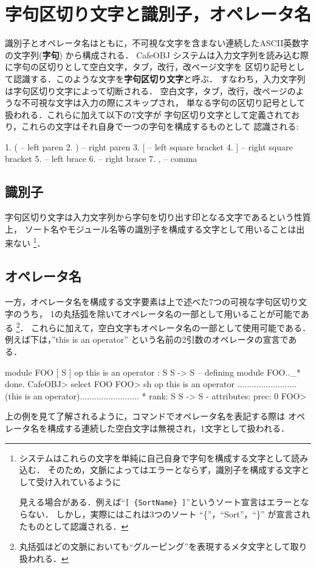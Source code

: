 \documentclass[a4paper,oneside,10pt]{memoir}
\newenvironment{vvtm}%
{\parskip=0pt\lineskip=0pt\begin{center}\begin{minipage}{0.8\textwidth}\begin{snugshade}}%
  {\end{snugshade}\end{minipage}\end{center}}
\begin{document}
\section{字句区切り文字と識別子，オペレータ名}
\label{sec:token}
識別子とオペレータ名はともに，不可視な文字を含まない連続したASCII英数字の文字列(\textbf{字句})
から構成される．
CafeOBJ システムは入力文字列を読み込む際に字句の区切りとして空白文字，タブ，改行，改ページ文字を
区切り記号として認識する．このような文字を\textbf{字句区切り文字}と呼ぶ．
すなわち，入力文字列は字句区切り文字によって切断される．
空白文字，タブ，改行，改ページのような不可視な文字は入力の際にスキップされ，
単なる字句の区切り記号として扱われる．これらに加えて以下の7文字が
字句区切り文字として定義されており，これらの文字はそれ自身で一つの字句を構成するものとして
認識される:
\begin{vvtm}
\begin{simplev}
   1. (          -- left paren 
   2. )          -- right paren
   3. [          -- left square bracket 
   4. ]          -- right square bracket
   5. {          -- left brace
   6. }          -- right brace
   7. ,          -- comma
\end{simplev}
\end{vvtm}

\subsection{識別子}
字句区切り文字は入力文字列から字句を切り出す印となる文字であるという性質上，
ソート名やモジュール名等の識別子を構成する文字として用いることは出来ない
\footnote{システムはこれらの文字を単純に自己自身で字句を構成する文字として読み込む．
そのため，文脈によってはエラーとならず，識別子を構成する文字として受け入れているように

見える場合がある．例えば``\texttt{[ \{SortName\} ]}''というソート宣言はエラーとならない．
しかし，実際にはこれは3つのソート ``\{''，``Sort''，``\}'' が宣言されたものとして認識される．}．

\subsection{オペレータ名}
一方，オペレータ名を構成する文字要素は上で述べた7つの可視な字句区切り文字のうち，%
1の丸括弧を除いてオペレータ名の一部として用いることが可能である%
\footnote{丸括弧はどの文脈においても``グルーピング''を表現するメタ文字として取り扱われる．}．
これらに加えて，空白文字もオペレータ名の一部として使用可能である．
例えば下は，''this is an operator'' という名前の2引数のオペレータの宣言である．
\begin{vvtm}
\begin{examplev}
module FOO {
  [ S ]
  op this is an operator : S S -> S
}
-- defining module FOO.._* done.
CafeOBJ> select FOO
FOO> sh op this       is an        operator 
.........................(this is an operator).........................
  * rank: S S -> S
  - attributes:  { prec: 0 }
FOO> 
\end{examplev}
\end{vvtm}
上の例を見て了解されるように，コマンドでオペレータ名を表記する際は%
オペレータ名を構成する連続した空白文字は無視され，1文字として扱われる．
\end{document}
